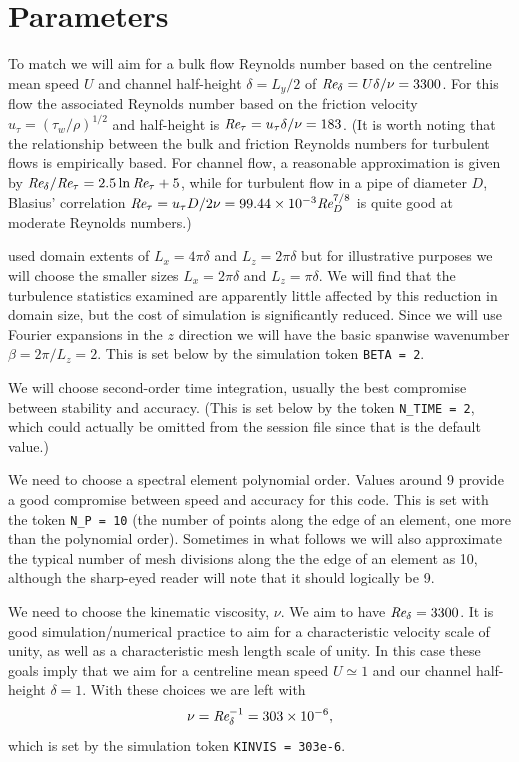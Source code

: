 \documentclass[11pt]{report}
\def\Rey{\mbox{\it Re}}                             %
\begin{document}
\section{Parameters}

To match \citet{kmm87} we will aim for a bulk flow Reynolds number
based on the centreline mean speed $U$ and channel half-height
$\delta=L_y/2$ of $\Rey_\delta=U\delta/\nu=3300$.  For this flow the
associated Reynolds number based on the friction velocity
$u_\tau=(\tau_w/\rho)^{1/2}$ and half-height is
$\Rey_\tau=u_\tau\delta/\nu=183$. (It is worth noting that the
relationship between the bulk and friction Reynolds numbers for
turbulent flows is empirically based. For channel flow, a reasonable
approximation is given by $\Rey_\delta/\Rey_\tau=2.5\ln\Rey_\tau+5$,
while for turbulent flow in a pipe of diameter $D$, Blasius'
correlation $\Rey_\tau=u_\tau D/2\nu=99.44\times10^{-3}\Rey_D^{7/8}$
is quite good at moderate Reynolds numbers.)

\citet{kmm87} used domain extents of $L_x=4\pi\delta$ and
$L_z=2\pi\delta$ but for illustrative purposes we will choose the
smaller sizes $L_x=2\pi\delta$ and $L_z=\pi\delta$. We will find that
the turbulence statistics examined are apparently little affected by
this reduction in domain size, but the cost of simulation is
significantly reduced.  Since we will use Fourier expansions in the
$z$ direction we will have the basic spanwise wavenumber
$\beta=2\pi/L_z=2$.  This is set below by the simulation token
\texttt{BETA = 2}.

We will choose second-order time integration, usually the best
compromise between stability and accuracy.  (This is set below by the
token \texttt{N\_TIME = 2}, which could actually be omitted from the
session file since that is the default value.)

We need to choose a spectral element polynomial order. Values around 9
provide a good compromise between speed and accuracy for this
code. This is set with the token \texttt{N\_P = 10} (the number of
points along the edge of an element, one more than the polynomial
order).  Sometimes in what follows we will also approximate the
typical number of mesh divisions along the the edge of an element as
10, although the sharp-eyed reader will note that it should logically
be 9.

We need to choose the kinematic viscosity, $\nu$. We aim to have
$\Rey_\delta=3300$. It is good simulation/numerical practice to aim
for a characteristic velocity scale of unity, as well as a
characteristic mesh length scale of unity. In this case these goals
imply that we aim for a centreline mean speed $U\simeq1$ and our
channel half-height $\delta=1$.  With these choices we are left with
\[
  \nu = \Rey_\delta^{-1} = 303 \times 10^{-6},
\]
which is set by the simulation token \texttt{KINVIS = 303e-6}.
\end{document}
